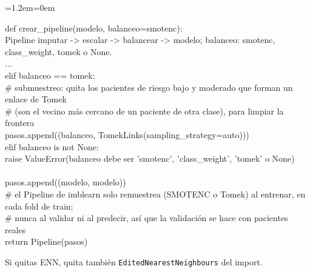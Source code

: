 \documentclass[11pt,a4paper]{article}
\newenvironment{codigo}
  {\par\smallskip\begin{list}{}{\leftmargin=1.2em\rightmargin=0em}\item\relax\ttfamily\scriptsize\raggedright}
  {\end{list}\smallskip}
\begin{document}
{\begin{codigo}
def crear\_\allowbreak{}pipeline(modelo, balanceo=\textquotedbl{}smotenc\textquotedbl{}): \\{}
\hspace*{2.08em}\textquotedbl{}\textquotedbl{}\textquotedbl{}Pipeline imputar -\textgreater{} escalar -\textgreater{} balancear -\textgreater{} modelo; balanceo: \textquotedbl{}smotenc\textquotedbl{}, \textquotedbl{}class\_\allowbreak{}weight\textquotedbl{}, \textquotedbl{}tomek\textquotedbl{} o None.\textquotedbl{}\textquotedbl{}\textquotedbl{} \\{}
\hspace*{2.08em}... \\{}
\hspace*{2.08em}elif balanceo == \textquotedbl{}tomek\textquotedbl{}: \\{}
\hspace*{4.16em}\# submuestreo: quita los pacientes de riesgo bajo y moderado que forman un enlace de Tomek \\{}
\hspace*{4.16em}\# (son el vecino más cercano de un paciente de otra clase), para limpiar la frontera \\{}
\hspace*{4.16em}pasos.append((\textquotedbl{}balanceo\textquotedbl{}, TomekLinks(sampling\_\allowbreak{}strategy=\textquotedbl{}auto\textquotedbl{}))) \\{}
\hspace*{2.08em}elif balanceo is not None: \\{}
\hspace*{4.16em}raise ValueError(\textquotedbl{}balanceo debe ser 'smotenc', 'class\_\allowbreak{}weight', 'tomek' o None\textquotedbl{}) \\{}
\mbox{} \\{}
\hspace*{2.08em}pasos.append((\textquotedbl{}modelo\textquotedbl{}, modelo)) \\{}
\hspace*{2.08em}\# el Pipeline de imblearn solo remuestrea (SMOTENC o Tomek) al entrenar, en cada fold de train; \\{}
\hspace*{2.08em}\# nunca al validar ni al predecir, así que la validación se hace con pacientes reales \\{}
\hspace*{2.08em}return Pipeline(pasos)
\end{codigo}
Si quitas ENN, quita también \texttt{EditedNearestNeighbours} del import.

}
\end{document}
